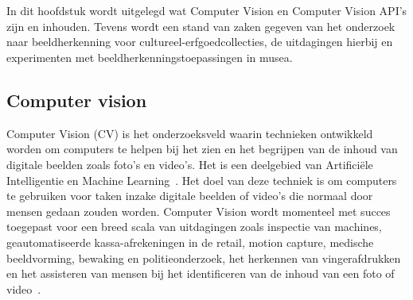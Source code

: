 \chapter{}
\label{ch:stand-van-zaken}





In dit hoofdstuk wordt uitgelegd wat Computer Vision en Computer Vision API’s zijn en inhouden. Tevens wordt een stand van zaken gegeven van het onderzoek naar beeldherkenning voor cultureel-erfgoedcollecties, de uitdagingen hierbij en experimenten met beeldherkenningstoepassingen in musea. 

\section{Computer vision}
\label{sec:cv}

Computer Vision (CV) is het onderzoeksveld waarin technieken ontwikkeld worden om computers te helpen bij het zien en het begrijpen van de inhoud van digitale beelden zoals foto’s en video’s. Het is een deelgebied van Artifici\"{e}le Intelligentie en Machine Learning~\autocite{wikiCV}. Het doel van deze techniek is om computers te gebruiken voor taken inzake digitale beelden of video’s die normaal door mensen gedaan zouden worden. Computer Vision wordt momenteel met succes toegepast voor een breed scala van uitdagingen zoals inspectie van machines,  geautomatiseerde kassa-afrekeningen in de retail, motion capture, medische beeldvorming, bewaking en politieonderzoek, het herkennen van vingerafdrukken en het assisteren van mensen bij het identificeren van de inhoud van een foto of video~\autocite{Brownlee2019}.

